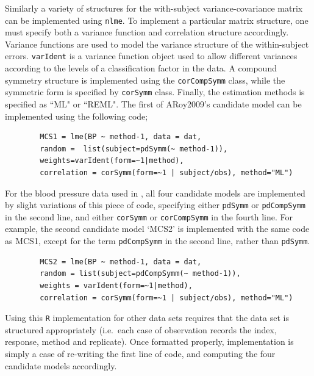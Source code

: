 \documentclass[12pt, a4paper]{report}
\theoremstyle{plain}
\theoremstyle{definition}
\theoremstyle{remark}
\begin{document}
	Similarly a variety of structures for the with-subject variance-covariance matrix can be implemented using \texttt{nlme}. To implement a particular matrix structure, one must specify both a variance function and correlation structure accordingly. Variance functions are used to model the variance structure of the within-subject errors. \texttt{varIdent} is a variance function object used to allow different variances according to the levels of a classification factor in the data. A compound symmetry structure is implemented using the \texttt{corCompSymm} class, while the symmetric form is specified by \texttt{corSymm} class. Finally, the estimation methods is specified as ``ML" or ``REML".
	\bigskip
	The first of ARoy2009's candidate model can be implemented using the following code;\\
	
	\begin{framed}
		\begin{verbatim}
		MCS1 = lme(BP ~ method-1, data = dat,
		random =  list(subject=pdSymm(~ method-1)),
		weights=varIdent(form=~1|method),
		correlation = corSymm(form=~1 | subject/obs), method="ML")
		\end{verbatim}
	\end{framed}
	
	For the blood pressure data used in \citet{AARoy20092009}, all four candidate models are implemented by slight variations of this piece of code, specifying either \texttt{pdSymm} or \texttt{pdCompSymm} in the second line, and either \texttt{corSymm} or \texttt{corCompSymm} in the fourth line.
	For example, the second candidate model `MCS2' is implemented with the same code as MCS1, except for the term \texttt{pdCompSymm} in the second line, rather than \texttt{pdSymm}.
	
	\begin{framed}
		\begin{verbatim}
		MCS2 = lme(BP ~ method-1, data = dat,
		random = list(subject=pdCompSymm(~ method-1)),
		weights = varIdent(form=~1|method),
		correlation = corSymm(form=~1 | subject/obs), method="ML")
		\end{verbatim}
	\end{framed}
	
	Using this \texttt{R} implementation for other data sets requires that the data set is structured appropriately (i.e.\ each case of observation records the index, response, method and replicate). Once formatted properly, implementation is simply a case of re-writing the first line of code, and computing the four candidate models accordingly.
	
\end{document}
